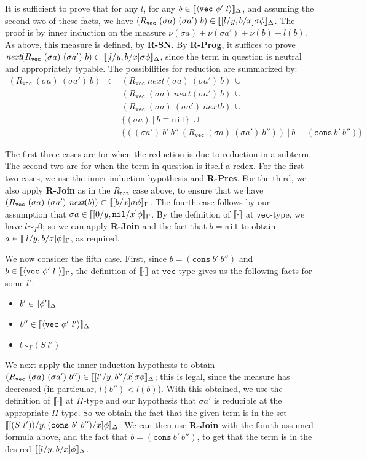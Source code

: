 \documentclass[copyright]{eptcs}
\newcommand{\next}[0]{\textit{next}}
\newcommand{\vc}[0]{\texttt{vec}}
\newcommand{\nat}[0]{\texttt{nat}}
\newcommand{\nil}[0]{\texttt{nil}}
\newcommand{\cons}[0]{\texttt{cons}}
\newcommand{\interp}[1]{[\negthinspace[#1]\negthinspace]}
\begin{document}
\noindent It is sufficient to prove that for any $l$, for any
$b\in\interp{\langle\vc\ \phi'\ l\rangle}_\Delta$, and assuming the
second two of these facts, we have $(R_\vc\ (\sigma a)\ (\sigma
a')\ b) \in\interp{[l/y,b/x]\sigma\phi}_\Delta$. The proof is by inner
induction on the measure $\nu(\sigma a)+\nu(\sigma a')+\nu(b)+l(b)$.
As above, this measure is defined, by \textbf{R-SN}.  By
\textbf{R-Prog}, it suffices to prove $\next(R_\vc\ (\sigma
a)\ (\sigma a')\ b) \subset\interp{[l/y,b/x]\sigma\phi}_\Delta$, since
the term in question is neutral and appropriately typable.  The
possibilities for reduction are summarized by:
\[
\begin{array}{lll}
(R_\vc\ (\sigma a)\ (\sigma a')\ b) & \subset & (R_\vc\ \next(\sigma a)\ (\sigma a')\ b)\ \cup\\
\ &\ & (R_\vc\ (\sigma a)\ \next(\sigma a')\ b)\ \cup \\
\ &\ & (R_\vc\ (\sigma a)\ (\sigma a')\ \next b)\ \cup \\
\ &\ & \{ (\sigma a)\ |\ b \equiv \nil \}\ \cup \\
\ &\ & \{ ((\sigma a')\ b'\ b''\ (R_\vc\ (\sigma a)\ (\sigma a')\ b''))\ |\ b \equiv (\cons\ b'\ b'')\}
\end{array}
\]

\noindent The first three cases are for when the reduction is due to
reduction in a subterm.  The second two are for when the term in
question is itself a redex.  For the first two cases, we use the inner
induction hypothesis and \textbf{R-Pres}.  For the third, we also
apply \textbf{R-Join} as in the $R_\nat$ case above, to ensure that we
have $(R_\vc\ (\sigma a)\ (\sigma
a')\ \next(b))\subset\interp{[b/x]\sigma\phi}_\Gamma$.  The fourth
case follows by our assumption that $\sigma
a\in\interp{[0/y,\nil/x]\phi}_\Gamma$.  By the definition of
$\interp{\cdot}$ at $\vc$-type, we have $l\sim_\Gamma 0$; so we can
apply \textbf{R-Join} and the fact that $b=\nil$ to obtain
$a\in\interp{[l/y,b/x]\phi}_\Gamma$, as required.

We now consider the fifth case. First, since $b = (\cons\ b'\ b'')$
and $b\in\interp{\langle\vc\ \phi'\ l\ \rangle}_\Gamma$, the
definition of $\interp{\cdot}$ at $\vc$-type gives us the following
facts for some $l'$:
\begin{itemize}
\item $b'\in\interp{\phi'}_\Delta$
\item $b''\in\interp{\langle\vc\ \phi'\ l'\rangle}_\Delta$
\item $l\sim_\Gamma (S\ l')$
\end{itemize}
\noindent We next apply the inner induction hypothesis to obtain
$(R_\vc\ (\sigma a)\ (\sigma
a')\ b'')\in\interp{[l'/y,b''/x]\sigma\phi}_\Delta$; this is legal,
since the measure has decreased (in particular, $l(b'')<l(b)$).  With
this obtained, we use the definition of $\interp{\cdot}$ at $\Pi$-type
and our hypothesis that $\sigma a'$ is reducible at the appropriate
$\Pi$-type.  So we obtain the fact that the given term is in the set
$\interp{[(S\ l'))/y,(\cons\ b'\ b'')/x]\phi}_\Delta$.  We can then
use \textbf{R-Join} with the fourth assumed formula above, and the
fact that $b = (\cons\ b'\ b'')$, to get that the term is in the
desired $\interp{[l/y,b/x]\phi}_\Delta$.
\end{document}
